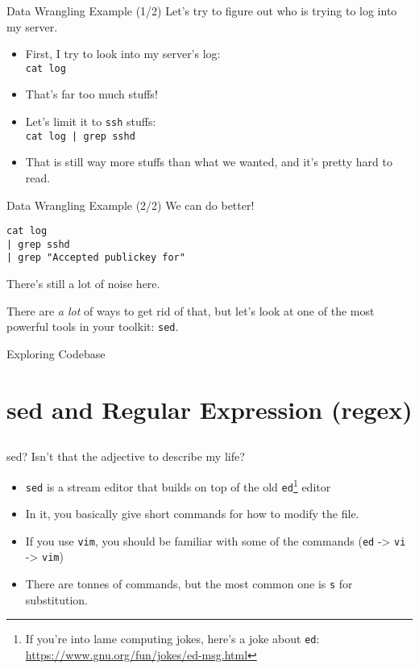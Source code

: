 \documentclass[12pt]{beamer}
\begin{document}
\begin{frame}[fragile]{Data Wrangling Example (1/2)}
  Let's try to figure out who is trying to log into my server.
  \begin{itemize}
    \item First, I try to look into my server's log: \\\texttt{cat log}
    \item That's far too much stuffs!
    \item Let's limit it to \texttt{ssh} stuffs: \\\texttt{cat log | grep sshd}
    \item That is still way more stuffs than what we wanted, and it's pretty hard to read.
  \end{itemize}
\end{frame}

\begin{frame}[fragile]{Data Wrangling Example (2/2)}
  We can do better!
  \begin{verbatim}
cat log
| grep sshd
| grep "Accepted publickey for"
  \end{verbatim}
  There's still a lot of noise here.

  There are \emph{a lot} of ways to get rid of that, but let’s look at one of the most powerful tools in your toolkit: \texttt{sed}.
\end{frame}

\begin{frame}{Exploring Codebase}
\end{frame}

\section{sed and Regular Expression (regex)}
\subsection{}
\begin{frame}{sed? Isn't that the adjective to describe my life?}
  \begin{itemize}
    \item \texttt{sed} is a stream editor that builds on top of the old \texttt{ed}\footnote{If you're into lame computing jokes, here's a joke about \texttt{ed}: \url{https://www.gnu.org/fun/jokes/ed-msg.html}} editor
    \item In it, you basically give short commands for how to modify the file.
    \item If you use \texttt{vim}, you should be familiar with some of the commands (\texttt{ed} -> \texttt{vi} -> \texttt{vim})
    \item There are tonnes of commands, but the most common one is \texttt{s} for substitution.
  \end{itemize}
\end{frame}
\end{document}

